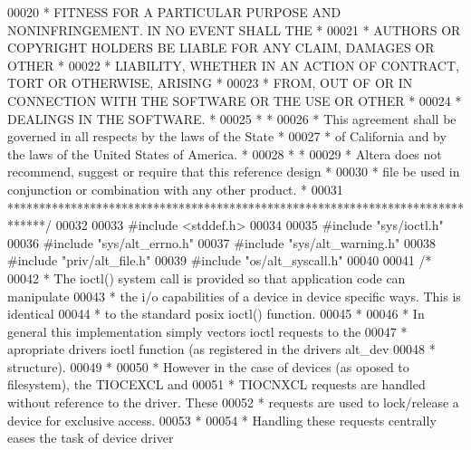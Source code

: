 \begin{DoxyCode}
00020 \textcolor{comment}{* FITNESS FOR A PARTICULAR PURPOSE AND NONINFRINGEMENT. IN NO EVENT SHALL THE *}
00021 \textcolor{comment}{* AUTHORS OR COPYRIGHT HOLDERS BE LIABLE FOR ANY CLAIM, DAMAGES OR OTHER      *}
00022 \textcolor{comment}{* LIABILITY, WHETHER IN AN ACTION OF CONTRACT, TORT OR OTHERWISE, ARISING     *}
00023 \textcolor{comment}{* FROM, OUT OF OR IN CONNECTION WITH THE SOFTWARE OR THE USE OR OTHER         *}
00024 \textcolor{comment}{* DEALINGS IN THE SOFTWARE.                                                   *}
00025 \textcolor{comment}{*                                                                             *}
00026 \textcolor{comment}{* This agreement shall be governed in all respects by the laws of the State   *}
00027 \textcolor{comment}{* of California and by the laws of the United States of America.              *}
00028 \textcolor{comment}{*                                                                             *}
00029 \textcolor{comment}{* Altera does not recommend, suggest or require that this reference design    *}
00030 \textcolor{comment}{* file be used in conjunction or combination with any other product.          *}
00031 \textcolor{comment}{******************************************************************************/}
00032 
00033 \textcolor{preprocessor}{#include <stddef.h>}
00034 
00035 \textcolor{preprocessor}{#include "sys/ioctl.h"}
00036 \textcolor{preprocessor}{#include "sys/alt_errno.h"}
00037 \textcolor{preprocessor}{#include "sys/alt_warning.h"}
00038 \textcolor{preprocessor}{#include "priv/alt_file.h"}
00039 \textcolor{preprocessor}{#include "os/alt_syscall.h"}
00040 
00041 \textcolor{comment}{/*}
00042 \textcolor{comment}{ * The ioctl() system call is provided so that application code can manipulate }
00043 \textcolor{comment}{ * the i/o capabilities of a device in device specific ways. This is identical}
00044 \textcolor{comment}{ * to the standard posix ioctl() function.}
00045 \textcolor{comment}{ *}
00046 \textcolor{comment}{ * In general this implementation simply vectors ioctl requests to the }
00047 \textcolor{comment}{ * apropriate drivers ioctl function (as registered in the drivers alt\_dev}
00048 \textcolor{comment}{ * structure).}
00049 \textcolor{comment}{ *}
00050 \textcolor{comment}{ * However in the case of devices (as oposed to filesystem), the TIOCEXCL and}
00051 \textcolor{comment}{ * TIOCNXCL requests are handled without reference to the driver. These }
00052 \textcolor{comment}{ * requests are used to lock/release a device for exclusive access.}
00053 \textcolor{comment}{ *}
00054 \textcolor{comment}{ * Handling these requests centrally eases the task of device driver }

\end{DoxyCode}
